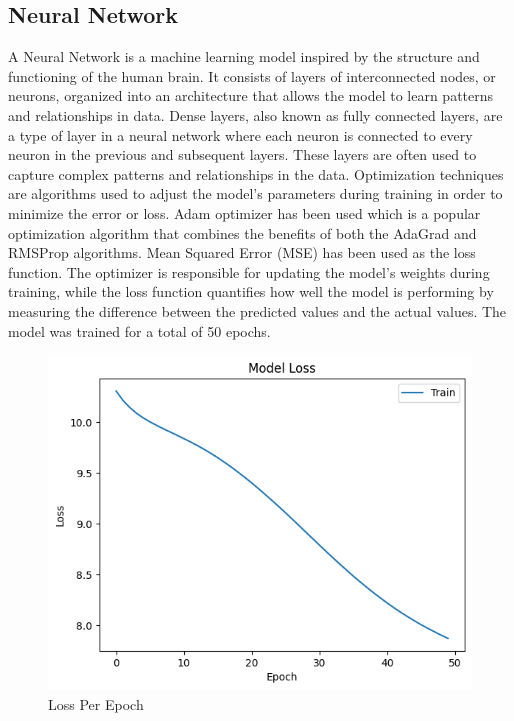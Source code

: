 \subsection*{Neural Network}
A Neural Network is a machine learning model inspired by the structure and functioning of the human brain. It consists of layers of interconnected nodes, or neurons, organized into an architecture that allows the model to learn patterns and relationships in data. Dense layers, also known as fully connected layers, are a type of layer in a neural network where each neuron is connected to every neuron in the previous and subsequent layers. These layers are often used to capture complex patterns and relationships in the data. Optimization techniques are algorithms used to adjust the model's parameters during training in order to minimize the error or loss. Adam optimizer has been used which is a  popular optimization algorithm that combines the benefits of both the AdaGrad and RMSProp algorithms. Mean Squared Error (MSE) has been used as the loss function. The optimizer is responsible for updating the model's weights during training, while the loss function quantifies how well the model is performing by measuring the difference between the predicted values and the actual values. The model was trained for a total of 50 epochs. 

\begin{figure}[h]
    \centering
    \includegraphics[width=1\linewidth]{img/Graphics/loss-in-nn.png}
    \caption{Loss Per Epoch}
    \label{loss-in-nn}
\end{figure}
\newpage

